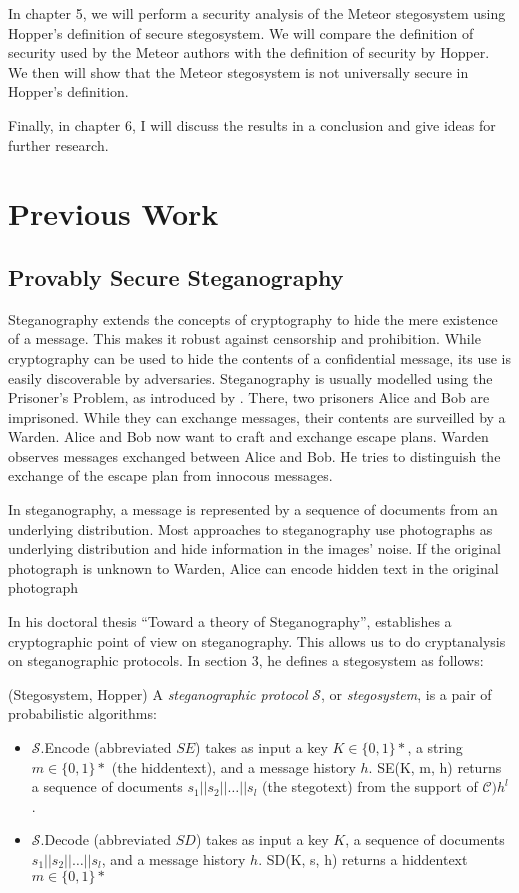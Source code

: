 \documentclass[english,version-2020-11]{uzl-thesis}
\begin{document}
In chapter 5, we will perform a security analysis of the Meteor stegosystem using Hopper's definition of secure stegosystem.
We will compare the definition of security used by the Meteor authors with the definition of security by Hopper.
We then will show that the Meteor stegosystem is not universally secure in Hopper's definition.

Finally, in chapter 6, I will discuss the results in a conclusion and give ideas for further research.

\chapter{Previous Work}

\section{Provably Secure Steganography}

Steganography extends the concepts of cryptography to hide the mere existence of a message.
This makes it robust against censorship and prohibition.
While cryptography can be used to hide the contents of a confidential message, its use is easily discoverable by adversaries.
Steganography is usually modelled using the Prisoner's Problem, as introduced by \cite{Simmons83}.
There, two prisoners Alice and Bob are imprisoned.
While they can exchange messages, their contents are surveilled by a Warden.
Alice and Bob now want to craft and exchange escape plans.
Warden observes messages exchanged between Alice and Bob.
He tries to distinguish the exchange of the escape plan from innocous messages.

In steganography, a message is represented by a sequence of documents from an underlying distribution.
Most approaches to steganography use photographs as underlying distribution and hide information in the images' noise.
If the original photograph is unknown to Warden, Alice can encode hidden text in the original photograph

In his doctoral thesis ``Toward a theory of Steganography'', \cite{Hopper04} establishes a cryptographic point of view on steganography. 
This allows us to do cryptanalysis on steganographic protocols.
In section 3, he defines a stegosystem as follows:

\begin{definition}
(Stegosystem, Hopper) A \emph{steganographic protocol} $\mathcal{S}$, or \emph{stegosystem}, is a pair of probabilistic algorithms:

\begin{itemize}
	\item $\mathcal{S}$.Encode (abbreviated $SE$) takes as input a key $K \in \{0,1\}*$, a string $m \in \{0,1\}*$ (the hiddentext), and a message history $h$.
		SE(K, m, h) returns a sequence of documents $s_1||s_2||\dots||s_l$ (the stegotext) from the support of $\mathcal{C})h^l$.
	\item $\mathcal{S}$.Decode (abbreviated $SD$) takes as input a key $K$, a sequence of documents $s_1||s_2||\dots||s_l$, and a message history $h$.
		SD(K, s, h) returns a hiddentext $m \in \{0,1\}*$
\end{itemize}
\end{definition}
\end{document}
